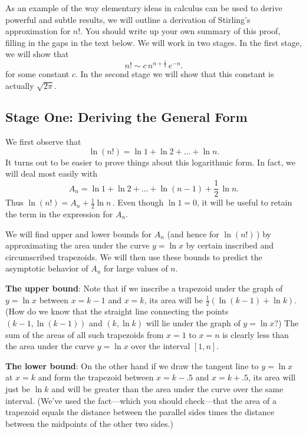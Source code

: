 As an example of the way elementary ideas in calculus can be used to
derive powerful and subtle results, we will outline a derivation of
Stirling's approximation for $n!$.  You should write up your own
summary of this proof, filling in the gaps in the text below.
We will work in two stages.  In the first stage, we will show that
\[
n!\sim c\,n^{n+\frac{1}{2}}\,e^{-n}.
\]
for some constant $c$.  In the second stage we will show that this
constant is actually $\sqrt{2\pi}$.

\subsection{Stage One: Deriving the General Form}
\label{subsec:stage-one-deriving-the-general-form}

We first observe that
\[
\ln (n!) = \ln 1 + \ln 2 + \ldots +\ln n.
\]
It turns out to be easier to prove things about this logarithmic
form. In fact, we will deal most easily with
\[
A_n=\ln 1 + \ln 2 + \ldots +\ln (n-1) + \dfrac{1}{2}\,\ln n.
\]
Thus $\ln(n!) = A_n+\tfrac{1}{2}\ln n \,.$ Even though $\ln 1 = 0$, it
will be useful to retain the term in the expression for $A_n$.

We will find upper and lower bounds for $A_n$ (and hence for
$\ln(n!)$\,) by approximating the area under the curve $y=\ln x$ by
certain inscribed and circumscribed trapezoids. We
will then use these bounds to predict the asymptotic behavior of $A_n$
for large values of $n$.





{\bf The upper bound}: Note that if we inscribe
a trapezoid under the graph of $y=\ln x$ between $x=k-1$ and $x=k$,
its area will be $\tfrac{1}{2}(\ln (k-1) +\ln k)$. (How do we know
that the straight line connecting the points $(k-1, \ln (k-1))$ and
$(k, \ln k)$ will lie under the graph of $y=\ln x$?) The sum of the
areas of all such trapezoids from $x=1$ to $x=n$ is clearly less than
the area under the curve $y=\ln x$ over the interval $[1,n]$. \ \


{\bf The lower bound}: On the other hand if we draw the tangent line
to $y=\ln x$ at \mbox{$x=k$} and form the trapezoid between $x=k-.5$
and $x=k+.5$, its area will just be $\ln k$ and will be greater than
the area under the curve over the same interval. (We've used the
fact---which you should check---that the area of a trapezoid equals
the distance between the parallel sides times the distance between the
midpoints of the other two sides.)

